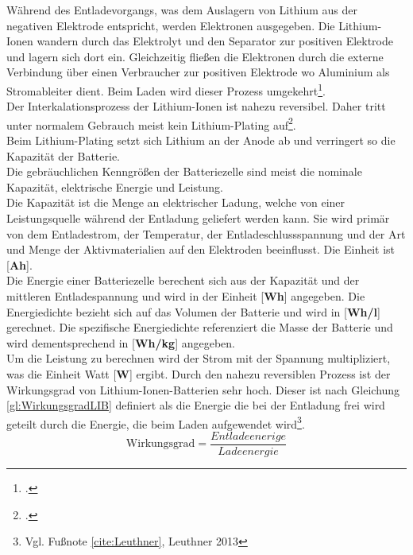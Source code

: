 Während des Entladevorgangs, was dem Auslagern von Lithium aus der negativen Elektrode entspricht, werden Elektronen ausgegeben. Die Lithium-Ionen wandern durch das Elektrolyt und den Separator zur positiven Elektrode und lagern sich dort ein. Gleichzeitig fließen die Elektronen durch die externe Verbindung über einen Verbraucher zur positiven Elektrode wo Aluminium als Stromableiter dient. Beim Laden wird dieser Prozess umgekehrt\footcite[Vgl.\label{cite:Leuthner}][S. 13-19]{Leuthner.2013}.\\
Der Interkalationsprozess der Lithium-Ionen ist nahezu reversibel. Daher tritt unter normalem Gebrauch meist kein Lithium-Plating auf\footcite[Vgl.][S. 265-270]{DAHN1994}.\\
Beim Lithium-Plating setzt sich Lithium an der Anode ab und verringert so die Kapazität der Batterie.\\


Die gebräuchlichen Kenngrößen der Batteriezelle sind meist die nominale Kapazität, elektrische Energie und Leistung. \\
Die Kapazität ist die Menge an elektrischer Ladung, welche von einer Leistungsquelle während der Entladung geliefert werden kann. Sie wird primär von dem Entladestrom, der Temperatur, der Entladeschlussspannung und der Art und Menge der Aktivmaterialien auf den Elektroden beeinflusst. Die Einheit ist [\textbf{Ah}].\\
Die Energie einer Batteriezelle berechent sich aus der Kapazität und der mittleren Entladespannung und wird in der Einheit [\textbf{Wh}] angegeben. Die Energiedichte bezieht sich auf das Volumen der Batterie und wird in [\textbf{Wh/l}] gerechnet. Die spezifische Energiedichte referenziert die Masse der Batterie und wird dementsprechend in [\textbf{Wh/kg}] angegeben.\\
Um die Leistung zu berechnen wird der Strom mit der Spannung multipliziert, was die Einheit Watt [\textbf{W}] ergibt. Durch den nahezu reversiblen Prozess ist der Wirkungsgrad von Lithium-Ionen-Batterien sehr hoch. Dieser ist nach Gleichung \ref{gl:WirkungsgradLIB} definiert als die Energie die bei der Entladung frei wird geteilt durch die Energie, die beim Laden aufgewendet wird\footnote{Vgl. Fußnote \ref{cite:Leuthner}, Leuthner 2013}.\\

\begin{equation}
	\mbox{Wirkungsgrad} = \frac{Entladeenerige}{Ladeenergie}
	\label{gl:WirkungsgradLIB}
\end{equation}


